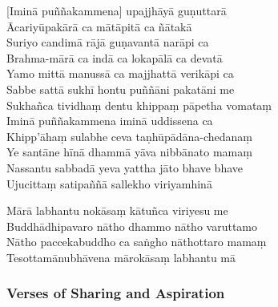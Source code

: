 [Iminā puññakammena] upajjhāyā guṇuttarā\\
Ācariyūpakārā ca mātāpitā ca ñātakā\\
Suriyo candimā rājā guṇavantā narāpi ca\\
Brahma-mārā ca indā ca lokapālā ca devatā\\
Yamo mittā manussā ca majjhattā verikāpi ca\\
Sabbe sattā sukhī hontu puññāni pakatāni me\\
Sukhañca tividhaṃ dentu khippaṃ pāpetha vomataṃ\\
Iminā puññakammena iminā uddissena ca\\
Khipp'āhaṃ sulabhe ceva taṇhūpādāna-chedanaṃ\\
Ye santāne hīnā dhammā yāva nibbānato mamaṃ\\
Nassantu sabbadā yeva yattha jāto bhave bhave\\
Ujucittaṃ satipaññā sallekho viriyamhinā

\clearpage

Mārā labhantu nokāsaṃ kātuñca viriyesu me\\
Buddhādhipavaro nātho dhammo nātho varuttamo\\
Nātho paccekabuddho ca saṅgho nāthottaro mamaṃ\\
Tesottamānubhāvena mārokāsaṃ labhantu mā\\


%

\subsubsection{Verses of Sharing and Aspiration}

\enlargethispage{\baselineskip}

\begin{leader}
\end{leader}


